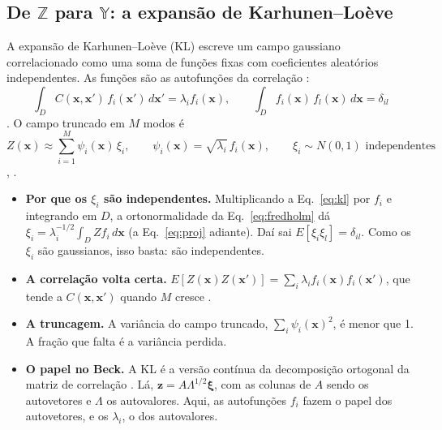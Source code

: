 \documentclass[11pt,a4paper]{article}
\newcommand{\Z}{\mathbb{Z}}
\newcommand{\Y}{\mathbb{Y}}
\newcommand{\xib}{\bm\xi}
\begin{document}
\subsection{De $\Z$ para $\Y$: a expansão de Karhunen--Loève}\label{sec:zy}
A expansão de Karhunen--Loève (KL) escreve um campo gaussiano correlacionado como uma soma de funções fixas com
coeficientes aleatórios independentes. As funções são as autofunções da correlação \citep[Cap.~2]{ghanem1991}:
\begin{equation}
  \int_D C(\bm x, \bm x')\,f_i(\bm x')\,d\bm x' = \lambda_i f_i(\bm x), \qquad
  \int_D f_i(\bm x)\,f_l(\bm x)\,d\bm x = \delta_{il}
  \label{eq:fredholm}
\end{equation}
\citep[Eq.~63]{ceron2025}. O campo truncado em $M$ modos é
\begin{equation}
  Z(\bm x) \approx \sum_{i=1}^{M} \psi_i(\bm x)\,\xi_i, \qquad \psi_i(\bm x) = \sqrt{\lambda_i}\,f_i(\bm x), \qquad
  \xi_i \sim N(0, 1) \text{ independentes}
  \label{eq:kl}
\end{equation}
\citep[Eq.~11]{cho2010}, \citep[Eq.~61]{ceron2025}.
\begin{itemize}
  \item \textbf{Por que os $\xi_i$ são independentes.} Multiplicando a Eq.~\eqref{eq:kl} por $f_i$ e integrando em $D$,
    a ortonormalidade da Eq.~\eqref{eq:fredholm} dá $\xi_i = \lambda_i^{-1/2}\int_D Z f_i\,d\bm x$ (a
    Eq.~\eqref{eq:proj} adiante). Daí sai $E[\xi_i \xi_l] = \delta_{il}$. Como os $\xi_i$ são gaussianos, isso basta: são
    independentes.
  \item \textbf{A correlação volta certa.} $E[Z(\bm x)Z(\bm x')] = \sum_i \lambda_i f_i(\bm x)f_i(\bm x')$, que tende a
    $C(\bm x, \bm x')$ quando $M$ cresce \citep[Eq.~62]{ceron2025}.
  \item \textbf{A truncagem.} A variância do campo truncado, $\sum_i \psi_i(\bm x)^2$, é menor que 1. A fração que
    falta é a variância perdida.
  \item \textbf{O papel no Beck.} A KL é a versão contínua da decomposição ortogonal da matriz de correlação
    \citep[Eqs.~4.56 e 4.57]{beck2014}. Lá, $\bm z = A\Lambda^{1/2}\xib$, com as colunas de $A$ sendo os autovetores e
    $\Lambda$ os autovalores. Aqui, as autofunções $f_i$ fazem o papel dos autovetores, e os $\lambda_i$, o dos
    autovalores.
\end{itemize}
\end{document}
